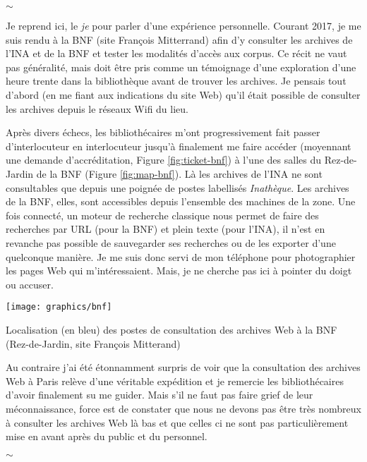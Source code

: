 \documentclass[symmetric,justified,marginals=raggedouter]{tufte-book}
\begin{document}
\begin{center}
	$\sim$
\end{center}

\noindent Je reprend ici, le \textit{je} pour parler d'une expérience personnelle. Courant 2017, je me suis rendu à la BNF (site François Mitterrand) afin d'y consulter les archives de l'INA et de la BNF et tester les modalités d'accès aux corpus. Ce récit ne vaut pas généralité, mais doit être pris comme un témoignage d'une exploration d'une heure trente dans la bibliothèque avant de trouver les archives. Je pensais tout d'abord (en me fiant aux indications du site Web) qu'il était possible de consulter les archives depuis le réseaux Wifi du lieu. 

Après divers échecs, les bibliothécaires m'ont progressivement fait passer d'interlocuteur en interlocuteur jusqu'à finalement me faire accéder (moyennant une demande d'accréditation, Figure \ref{fig:ticket-bnf}) à l'une des salles du Rez-de-Jardin de la BNF (Figure \ref{fig:map-bnf}). Là les archives de l'INA ne sont consultables que depuis une poignée de postes labellisés \textit{Inathèque}. Les archives de la BNF, elles, sont accessibles depuis l'ensemble des  machines de la zone. Une fois connecté, un moteur de recherche classique nous permet de faire des recherches par URL (pour la BNF) et plein texte (pour l'INA), il n'est en revanche pas possible de sauvegarder ses recherches ou de les exporter d'une quelconque manière. Je me suis donc servi de mon téléphone pour photographier les pages Web qui m'intéressaient. Mais, je ne cherche pas ici à pointer du doigt ou accuser. 

\begin{marginfigure}%
  \texttt{[image: graphics/bnf]}
  \caption{Localisation (en bleu) des postes de consultation des archives Web à la BNF (Rez-de-Jardin, site François Mitterand)}
  \label{fig:map-bnf}
\end{marginfigure} 

Au contraire j'ai été étonnamment surpris de voir que la consultation des archives Web à Paris relève d'une véritable expédition et je remercie les bibliothécaires d'avoir finalement su me guider. Mais s'il ne faut pas faire grief de leur méconnaissance, force est de constater que nous ne devons pas être très nombreux à consulter les archives Web là bas et que celles ci ne sont pas particulièrement mise en avant après du public et du personnel.

\begin{center}
	$\sim$
\end{center}
  
\end{document}
